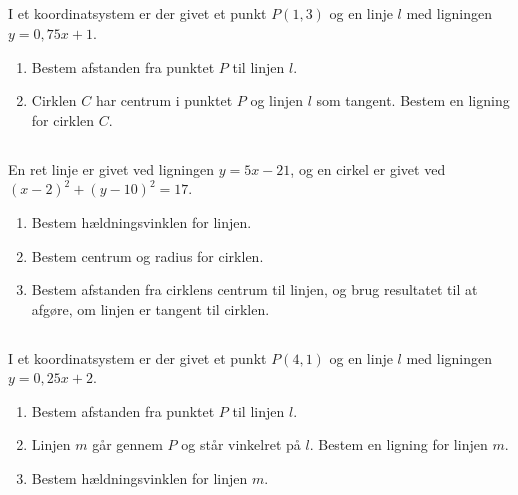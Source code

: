 \documentclass[10pt,a4paper,table]{article}
\begin{document}
\subsection{}

I et koordinatsystem er der givet et punkt $P(1, 3)$ og en linje $l$ med ligningen $y = 0{,}75x + 1$.

\begin{enumerate}
  \item Bestem afstanden fra punktet $P$ til linjen $l$.
  \item Cirklen $C$ har centrum i punktet $P$ og linjen $l$ som tangent. Bestem en ligning for cirklen $C$.
\end{enumerate}


\subsection{}

En ret linje er givet ved ligningen $y = 5x - 21$, og en cirkel er givet ved $(x-2)^2 + (y-10)^2 = 17$.

\begin{enumerate}
  \item Bestem hældningsvinklen for linjen.
  \item Bestem centrum og radius for cirklen.
  \item Bestem afstanden fra cirklens centrum til linjen, og brug resultatet til at afgøre, om linjen er tangent til cirklen.
\end{enumerate}


\subsection{}

I et koordinatsystem er der givet et punkt $P(4, 1)$ og en linje $l$ med ligningen $y = 0{,}25x + 2$.

\begin{enumerate}
  \item Bestem afstanden fra punktet $P$ til linjen $l$.
  \item Linjen $m$ går gennem $P$ og står vinkelret på $l$. Bestem en ligning for linjen $m$.
  \item Bestem hældningsvinklen for linjen $m$.
\end{enumerate}


\subsection{}
\end{document}
